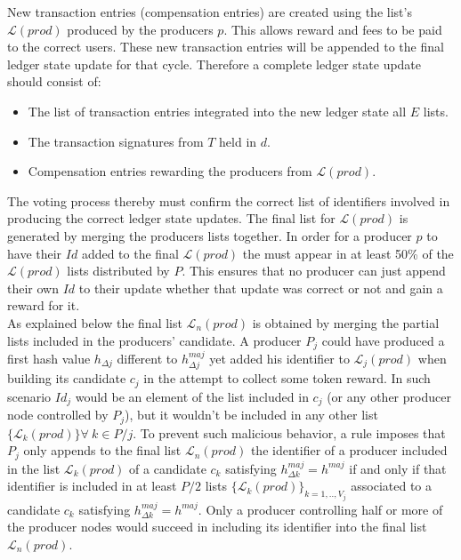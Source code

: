 \documentclass{article}
\begin{document}
New transaction entries (compensation entries) are created using the list's  $\mathcal{L}(prod)$ produced by the producers $p$. This allows reward and fees to be paid to the correct users. These new transaction entries will be appended to the final ledger state update for that cycle. Therefore a complete ledger state update should consist of:

\begin{itemize}
\item The list of transaction entries integrated into the new ledger state all $E$ lists.
\item The transaction signatures from $T$ held in $d$.
\item Compensation entries rewarding the producers from $\mathcal{L}(prod)$.

\end{itemize}

The voting process thereby must confirm the correct list of identifiers involved in producing the correct ledger state updates. The final list for  $\mathcal{L}(prod)$ is generated by merging the producers lists together. In order for a producer $p$ to have their $Id$ added to the final  $\mathcal{L}(prod)$ the must appear in at least 50\% of the  $\mathcal{L}(prod)$ lists distributed by $P$. This ensures that no producer can just append their own $Id$ to their update whether that update was correct or not and gain a reward for it.  \\

As explained below the final list $\mathcal{L}_n(prod)$ is obtained by merging the partial lists included in the producers' candidate. A producer $P_j$ could have produced a first hash value $h_{\Delta j}$ different to $h^{maj}_{\Delta j}$ yet added his identifier to $\mathcal{L}_j(prod)$ when building its candidate $c_j$ in the attempt to collect some token reward. In such scenario $Id_j$ would be an element of the list included in $c_j$ (or any other producer node controlled by $P_j$), but it wouldn't be included in any other list $\{\mathcal{L}_k(prod)\} \forall~k \in P/j$. To prevent such malicious behavior, a rule imposes that $P_j$ only appends to the final list $\mathcal{L}_n(prod)$ the identifier of a producer included in the list $\mathcal{L}_k(prod)$ of a candidate $c_k$ satisfying $h^{maj}_{\Delta k} = h^{maj}$ if and only if that identifier is included in at least $P/2$ lists $\{\mathcal{L}_{k}(prod)\}_{k=1,..,V_j}$ associated to a candidate $c_{k}$ satisfying $h^{maj}_{\Delta k} = h^{maj}$. Only a producer controlling half or more of the producer nodes would succeed in including its identifier into the final list $\mathcal{L}_n(prod)$.\\
\end{document}
